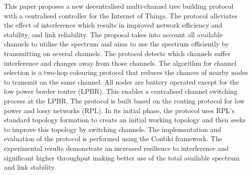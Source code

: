 This paper proposes a new decentralised multi-channel tree building protocol with a centralised controller for the Internet of Things. The protocol alleviates the effect of interference which results in improved network efficiency and stability, and link reliability. The proposal takes into account all available channels to utilise the spectrum and aims to use the spectrum efficiently by transmitting on several channels. The protocol detects which channels suffer interference and changes away from those channels. The algorithm for channel selection is a two-hop colouring protocol that reduces the chances of nearby nodes to transmit on the same channel. All nodes are battery operated except for the low power border router (LPBR). This enables a centralised channel switching process at the LPBR. The protocol is built based on the routing protocol for low power and lossy networks (RPL). In its initial phase, the protocol uses RPL's standard topology formation to create an initial working topology and then seeks to improve this topology by switching channels. The implementation and evaluation of the protocol is performed using the Contiki framework. The experimental results demonstrate an increased resilience to interference and significant higher throughput making better use of the total available spectrum and link stability.